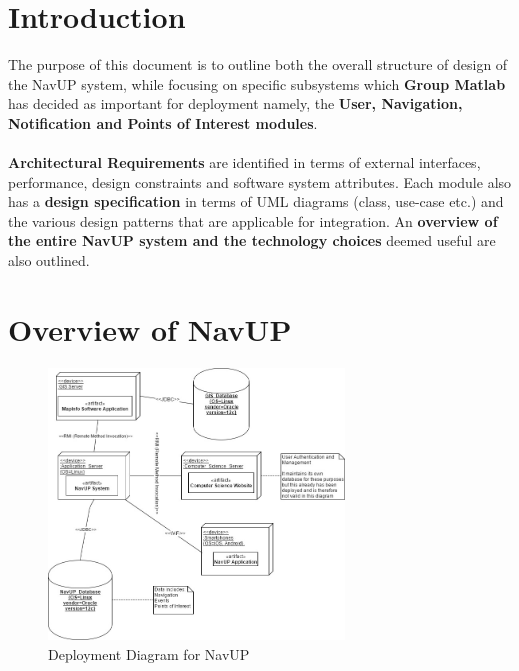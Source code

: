 \documentclass[runningheads,a4paper]{article}
\begin{document}



\begingroup



\tableofcontents


\endgroup

\newpage

\section{Introduction}
The purpose of this document is to outline both the overall structure of design of the NavUP system, while focusing on specific subsystems which \textbf{Group Matlab} has decided as important for deployment namely, the \textbf{User, Navigation, Notification and Points of Interest modules}.\\ \\
\noindent
\textbf{Architectural Requirements} are identified in terms of external interfaces, performance, design constraints and software system attributes. Each module also has a \textbf{design specification} in terms of UML diagrams (class, use-case etc.) and the various design patterns that are applicable for integration. An \textbf{overview of the entire NavUP system and the technology choices} deemed useful are also outlined.

\section{Overview of NavUP}

\begin{figure}[H]
   	\centering
   	\includegraphics[width=0.7\textwidth]{Images/Diagrams/Deployment/DeploymentDiagram.jpg}
   	\caption{Deployment Diagram for NavUP}
\end{figure}
\end{document}
